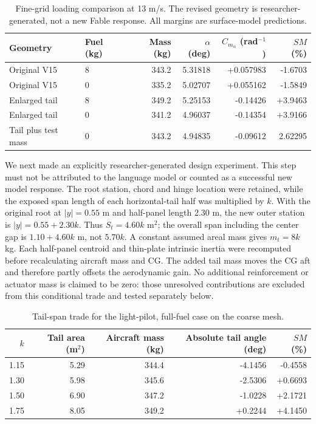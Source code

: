 \documentclass[11pt,a4paper]{article}
\begin{document}
\begin{table}[htbp]
\centering\small
\caption{Fine-grid loading comparison at 13 m/s. The revised geometry is researcher-generated, not a new Fable response. All margins are surface-model predictions.}
\label{tab:tail-loading}
\begin{tabular}{llrrrr}
\toprule
Geometry & Fuel (kg) & Mass (kg) & $\alpha$ (deg) & $C_{m_\alpha}$ (rad$^{-1}$) & $SM$ (\%)\\
\midrule
Original V15 & 8 & 343.2 & 5.31818 & +0.057983 & -1.6703\\
Original V15 & 0 & 335.2 & 5.02707 & +0.055162 & -1.5849\\
Enlarged tail & 8 & 349.2 & 5.25153 & -0.14426 & +3.9463\\
Enlarged tail & 0 & 341.2 & 4.96037 & -0.14354 & +3.9166\\
Tail plus test mass & 0 & 343.2 & 4.94835 & -0.09612 & 2.62295\\
\bottomrule
\end{tabular}
\end{table}

We next made an explicitly researcher-generated design experiment. This step
must not be attributed to the language model or counted as a successful new
model response. The root station, chord and hinge location were retained,
while the exposed span length of each horizontal-tail half was multiplied by
$k$. With the original root at $|y|=0.55$ m and half-panel length 2.30 m, the
new outer station is $|y|=0.55+2.30k$. Thus $S_t=4.60k$ m$^2$; the overall
span including the center gap is $1.10+4.60k$ m, not $5.70k$. A constant
assumed areal mass gives $m_t=8k$ kg. Each half-panel centroid and thin-plate
intrinsic inertia were recomputed before recalculating aircraft mass and CG.
The added tail mass moves the CG aft and therefore partly offsets the
aerodynamic gain. No additional reinforcement or actuator mass is claimed to
be zero: those unresolved contributions are excluded from this conditional
trade and tested separately below.

\begin{table}[htbp]
\centering\small
\caption{Tail-span trade for the light-pilot, full-fuel case on the coarse mesh.}
\label{tab:tail-span-trade}
\begin{tabular}{rrrrr}
\toprule
$k$ & Tail area (m$^2$) & Aircraft mass (kg) & Absolute tail angle (deg) & $SM$ (\%)\\
\midrule
1.15 & 5.29 & 344.4 & -4.1456 & -0.4558\\
1.30 & 5.98 & 345.6 & -2.5306 & +0.6693\\
1.50 & 6.90 & 347.2 & -1.0228 & +2.1721\\
1.75 & 8.05 & 349.2 & +0.2244 & +4.1450\\
\bottomrule
\end{tabular}
\end{table}
\end{document}
